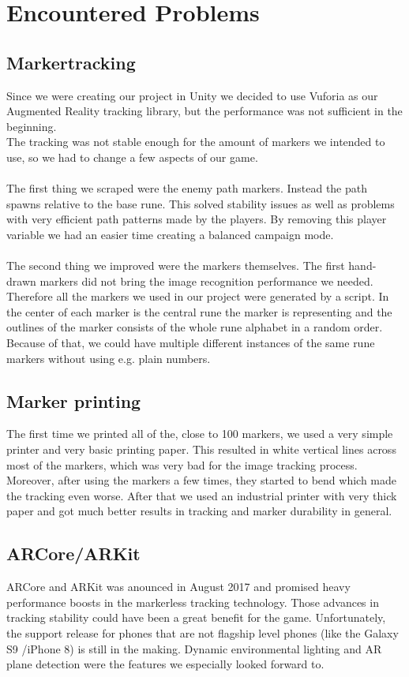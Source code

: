 \section{Encountered Problems}

\subsection{Markertracking}

Since we were creating our project in Unity we decided to use Vuforia as our Augmented Reality tracking library, but the performance was not sufficient in the beginning.\\
The tracking was not stable enough for the amount of markers we intended to use, so we had to change a few aspects of our game.\\\\
The first thing we scraped were the enemy path markers. Instead the path spawns relative to the base rune. This solved stability issues as well as problems with very efficient path patterns made by the players.
By removing this player variable we had an easier time creating a balanced campaign mode.\\\\
The second thing we improved were the markers themselves. The first hand-drawn markers did not bring the image recognition performance we needed.\\
Therefore all the markers we used in our project were generated by a script. In the center of each marker is the central rune the marker is representing and the outlines of the marker consists of the whole rune alphabet in a random order.
Because of that, we could have multiple different instances of the same rune markers without using e.g. plain numbers.\\

\subsection{Marker printing}

The first time we printed all of the, close to 100 markers, we used a very simple printer and very basic printing paper.
This resulted in white vertical lines across most of the markers, which was very bad for the image tracking process. 
Moreover, after using the markers a few times, they started to bend which made the tracking even worse.
After that we used an industrial printer with very thick paper and got much better results in tracking and marker durability in general.

\subsection{ARCore/ARKit}

ARCore and ARKit was anounced in August 2017 and promised heavy performance boosts in the markerless tracking technology. Those advances in tracking stability could have been a great benefit for 
the game. Unfortunately, the support release for phones that are not flagship level phones (like the Galaxy S9 /iPhone 8) is still in the making. Dynamic environmental lighting and AR plane detection
were the features we especially looked forward to.

